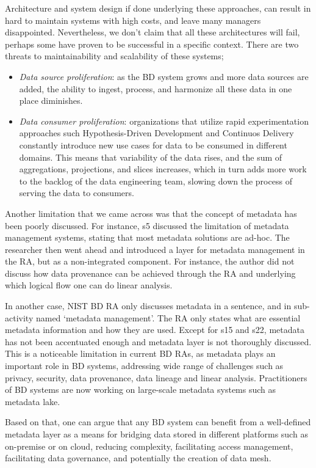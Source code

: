 \documentclass{ieeeaccess}
\begin{document}
Architecture and system design if done underlying these approaches, can result in hard to maintain systems with high costs, and leave many managers disappointed. Nevertheless, we don't claim that all these architectures will fail, perhaps some have proven to be successful in a specific context. There are two threats to maintainability and scalability of these systems; 

\begin{itemize}
    \item \emph{Data source proliferation}: as the BD system grows and more data
    sources are added, the ability to ingest, process, and harmonize all these data in one place diminishes.
    \item \emph{Data consumer proliferation}: organizations that utilize rapid experimentation approaches such Hypothesis-Driven Development and Continuos Delivery constantly introduce new use cases for data to be consumed in different domains. This means that variability of the data rises, and the sum of aggregations, projections, and slices increases, which in turn adds more work to the backlog of the data engineering team, slowing down the process of serving the data to consumers.
\end{itemize}

Another limitation that we came across was that the concept of metadata has been poorly discussed. For instance, s5 discussed the limitation of metadata management systems, stating that most metadata solutions are ad-hoc. The researcher then went ahead and introduced a layer for metadata management in the RA, but as a non-integrated component. For instance, the author did not discuss how data provenance can be achieved through the RA and underlying which logical flow one can do linear analysis. 

In another case, NIST BD RA only discusses metadata in a sentence, and in sub-activity named ‘metadata management’. The RA only states what are essential metadata information and how they are used. Except for s15 and s22, metadata has not been accentuated enough and metadata layer is not thoroughly discussed. This is a noticeable limitation in current BD RAs, as metadata plays an important role in BD systems, addressing wide range of challenges such as privacy, security, data provenance, data lineage and linear analysis. Practitioners of BD systems are now working on large-scale metadata systems such as metadata lake.

Based on that, one can argue that any BD system can benefit from a well-defined metadata layer as a means for bridging data stored in different platforms such as on-premise or on cloud, reducing complexity, facilitating access management, facilitating data governance, and potentially the creation of data mesh.
\end{document}

